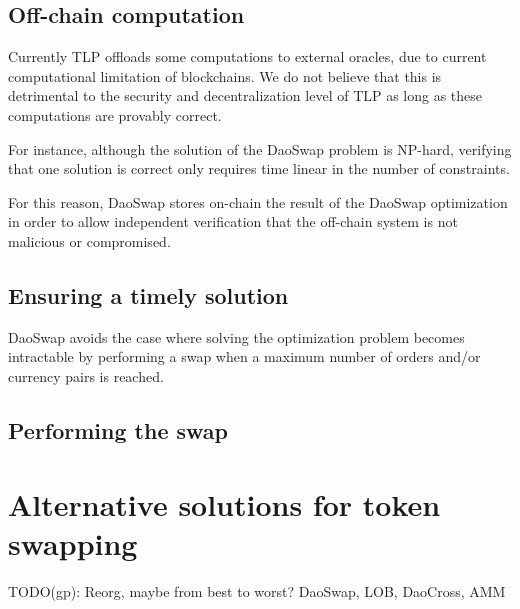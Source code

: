 \documentclass[11pt, reqno]{amsart}
\theoremstyle{definition}
\theoremstyle{remark}
\begin{document}
\subsection{Off-chain computation}
Currently TLP offloads some computations to external oracles, due to current
computational limitation of blockchains. We do not believe that this is detrimental
to the security and decentralization level of TLP as long as these computations
are provably correct.

For instance, although the solution of the DaoSwap problem is NP-hard, verifying
that one solution is correct only requires time linear in the number of
constraints.

For this reason, DaoSwap stores on-chain the result of the DaoSwap optimization
in order to allow independent verification that the off-chain system is not
malicious or compromised.

\subsection{Ensuring a timely solution}
DaoSwap avoids the case where solving the optimization problem becomes
intractable by performing a swap when a maximum number of orders and/or
currency pairs is reached.

\subsection{Performing the swap}


\section{Alternative solutions for token swapping}
\label{AlSoToSw}

TODO(gp): Reorg, maybe from best to worst? DaoSwap, LOB, DaoCross, AMM
\end{document}
